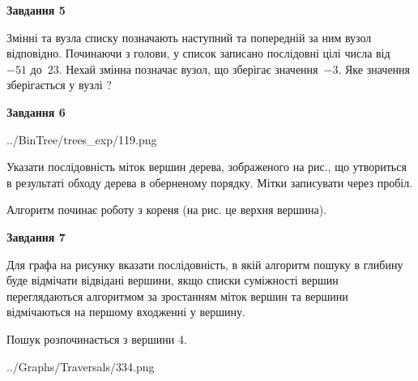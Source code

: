 \documentclass[12pt, ukrainian]{article}
\begin{document}
{\begin {large}
{\begin {center}\textbf{Завдання 5}\end {center}}\par
Змінні  та  вузла списку позначають наступний та попередній за ним вузол відповідно. Починаючи з голови, у список записано послідовні цілі числа від~$-51$ до~$23$. Нехай змінна  позначає вузол, що зберігає значення~$-3$.
Яке значення зберігається у вузлі  ?\par
\newpage

{\begin {center}\textbf{Завдання 6}\end {center}}\par

\begin{center}
	{../BinTree/trees_exp/119.png}
\end{center}
Указати послідовність міток вершин дерева, зображеного на рис., що утвориться в результаті обходу дерева в оберненому порядку. Мітки записувати через пробіл.\par Алгоритм починає роботу з кореня (на рис. це верхня вершина).\par
\newpage

{\begin {center}\textbf{Завдання 7}\end {center}}\par
Для графа на рисунку вказати послідовність, в якій алгоритм пошуку в глибину буде відмічати відвідані вершини, якщо списки суміжності вершин переглядаються алгоритмом за зростанням міток вершин та вершини відмічаються на першому вход\-женні у вершину.\par
Пошук розпочинається з вершини 4.\par

\begin{center}
	{../Graphs/Traversals/334.png}
\end{center}\par
\newpage


\end{large}}
\end{document}
